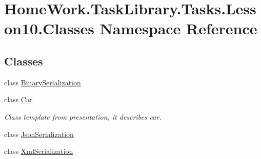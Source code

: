 \hypertarget{namespace_home_work_1_1_task_library_1_1_tasks_1_1_lesson10_1_1_classes}{}\section{Home\+Work.\+Task\+Library.\+Tasks.\+Lesson10.\+Classes Namespace Reference}
\label{namespace_home_work_1_1_task_library_1_1_tasks_1_1_lesson10_1_1_classes}
\subsection*{Classes}
\begin{DoxyCompactItemize}
\item 
class \mbox{\hyperlink{class_home_work_1_1_task_library_1_1_tasks_1_1_lesson10_1_1_classes_1_1_binary_serialization}{Binary\+Serialization}}
\item 
class \mbox{\hyperlink{class_home_work_1_1_task_library_1_1_tasks_1_1_lesson10_1_1_classes_1_1_car}{Car}}
\begin{DoxyCompactList}\small\item\em Class template from presentation, it describes car. \end{DoxyCompactList}\item 
class \mbox{\hyperlink{class_home_work_1_1_task_library_1_1_tasks_1_1_lesson10_1_1_classes_1_1_json_serialization}{Json\+Serialization}}
\item 
class \mbox{\hyperlink{class_home_work_1_1_task_library_1_1_tasks_1_1_lesson10_1_1_classes_1_1_xml_serialization}{Xml\+Serialization}}
\end{DoxyCompactItemize}
